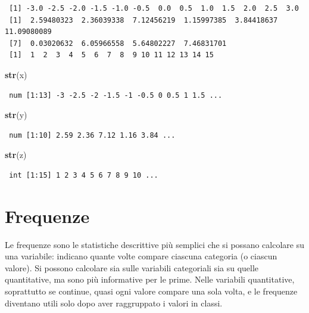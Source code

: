 \documentclass[
  a4paper,
  DIV=11,
  numbers=noendperiod]{scrreprt}
\newenvironment{Shaded}{\begin{snugshade}}{\end{snugshade}}
\newcommand{\FunctionTok}[1]{\textcolor[rgb]{0.13,0.29,0.53}{\textbf{#1}}}
\newcommand{\NormalTok}[1]{#1}
\begin{document}
\begin{verbatim}
 [1] -3.0 -2.5 -2.0 -1.5 -1.0 -0.5  0.0  0.5  1.0  1.5  2.0  2.5  3.0
 [1]  2.59480323  2.36039338  7.12456219  1.15997385  3.84418637 11.09080089
 [7]  0.03020632  6.05966558  5.64802227  7.46831701
 [1]  1  2  3  4  5  6  7  8  9 10 11 12 13 14 15
\end{verbatim}

\begin{Shaded}
\begin{Highlighting}[]
\FunctionTok{str}\NormalTok{(x)}
\end{Highlighting}
\end{Shaded}

\begin{verbatim}
 num [1:13] -3 -2.5 -2 -1.5 -1 -0.5 0 0.5 1 1.5 ...
\end{verbatim}

\begin{Shaded}
\begin{Highlighting}[]
\FunctionTok{str}\NormalTok{(y)}
\end{Highlighting}
\end{Shaded}

\begin{verbatim}
 num [1:10] 2.59 2.36 7.12 1.16 3.84 ...
\end{verbatim}

\begin{Shaded}
\begin{Highlighting}[]
\FunctionTok{str}\NormalTok{(z)}
\end{Highlighting}
\end{Shaded}

\begin{verbatim}
 int [1:15] 1 2 3 4 5 6 7 8 9 10 ...
\end{verbatim}

\section{Frequenze}\label{frequenze}

Le frequenze sono le statistiche descrittive più semplici che si possano
calcolare su una variabile: indicano quante volte compare ciascuna
categoria (o ciascun valore). Si possono calcolare sia sulle variabili
categoriali sia su quelle quantitative, ma sono più informative per le
prime. Nelle variabili quantitative, soprattutto se continue, quasi ogni
valore compare una sola volta, e le frequenze diventano utili solo dopo
aver raggruppato i valori in classi.
\end{document}
